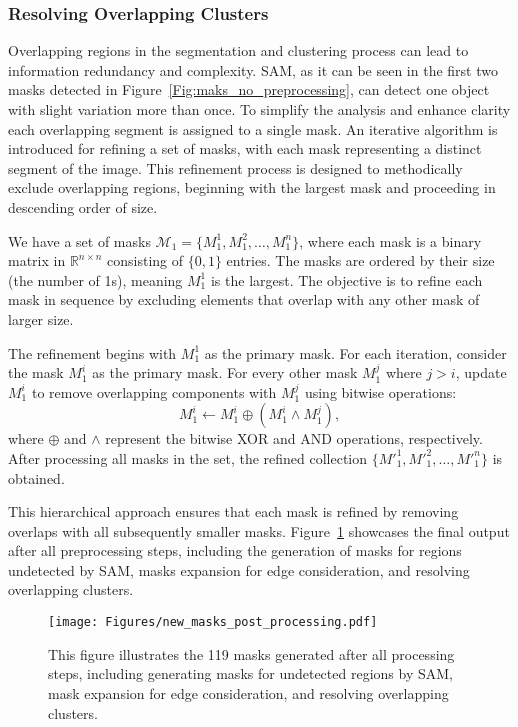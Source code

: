 \subsubsection{Resolving Overlapping Clusters}

Overlapping regions in the segmentation and clustering process can lead to information redundancy and complexity. SAM, as it can be seen in the first two masks detected in Figure~\ref{Fig:maks_no_preprocessing}, can detect one object with slight variation more than once. To simplify the analysis and enhance clarity each overlapping segment is assigned to a single mask. 
An iterative algorithm is introduced for refining a set of masks, with each mask representing a distinct segment of the image. This refinement process is designed to methodically exclude overlapping regions, beginning with the largest mask and proceeding in descending order of size.

We have a set of masks \(\mathcal{M}_1 = \{M_1^1, M_1^2, \ldots, M_1^n\}\), where each mask is a binary matrix in \(\mathbb{R}^{n \times n}\) consisting of \(\{0, 1\}\) entries. The masks are ordered by their size (the number of 1s), meaning \(M_1^1\) is the largest. The objective is to refine each mask in sequence by excluding elements that overlap with any other mask of larger size.

The refinement begins with \(M_1^1\) as the primary mask. For each iteration, consider the mask \(M_1^i\) as the primary mask. For every other mask \(M_1^j\) where \(j > i\), update \(M_1^i\) to remove overlapping components with \(M_1^j\) using bitwise operations:
\begin{equation}
M_1^i \leftarrow M_1^i \oplus (M_1^i \land M_1^j),
\end{equation}
where \( \oplus \) and \( \land \) represent the bitwise XOR and AND operations, respectively. After processing all masks in the set, the refined collection \(\{M'^1_1, M'^2_1, \ldots, M'^n_1\}\) is obtained.


This hierarchical approach ensures that each mask is refined by removing overlaps with all subsequently smaller masks. Figure~\ref{Fig:new_masks_post_processing} showcases the final output after all preprocessing steps, including the generation of masks for regions undetected by SAM, masks expansion for edge consideration, and resolving overlapping clusters.

\begin{figure}[ht!]
\begin{center}
\texttt{[image: Figures/new\_masks\_post\_processing.pdf]}
\end{center}
\caption{This figure illustrates the 119 masks generated after all processing steps, including generating masks for undetected regions by SAM, mask expansion for edge consideration, and resolving overlapping clusters.}
\label{Fig:new_masks_post_processing}
\end{figure}

